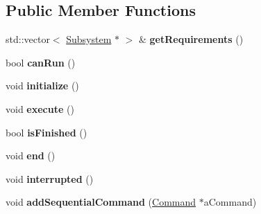 \subsection*{Public Member Functions}
\begin{DoxyCompactItemize}
\item 
\mbox{\label{classlib_iterative_robot_1_1_command_group_abf3d539920648f9dec9dfdef30699c82}} 
std\+::vector$<$ \mbox{\hyperlink{classlib_iterative_robot_1_1_subsystem}{Subsystem}} $\ast$ $>$ \& {\bfseries get\+Requirements} ()
\item 
\mbox{\label{classlib_iterative_robot_1_1_command_group_abd75c9b52e6b4ae5af1b6724e865311f}} 
bool {\bfseries can\+Run} ()
\item 
\mbox{\label{classlib_iterative_robot_1_1_command_group_a99800c5dbd05ab750aa0bb27518d0467}} 
void {\bfseries initialize} ()
\item 
\mbox{\label{classlib_iterative_robot_1_1_command_group_a5e91d370cafde43548d79945ccb4d8fe}} 
void {\bfseries execute} ()
\item 
\mbox{\label{classlib_iterative_robot_1_1_command_group_a96807a2763adf9e21ebf2cb9e3574e3c}} 
bool {\bfseries is\+Finished} ()
\item 
\mbox{\label{classlib_iterative_robot_1_1_command_group_a28ad3a1c2f6b4f9aea10efa1a824895e}} 
void {\bfseries end} ()
\item 
\mbox{\label{classlib_iterative_robot_1_1_command_group_a5174a8e63675bead12b84e39df0ae90e}} 
void {\bfseries interrupted} ()
\item 
\mbox{\label{classlib_iterative_robot_1_1_command_group_ae6cdd735460cf917243bdbfe451b651a}} 
void {\bfseries add\+Sequential\+Command} (\mbox{\hyperlink{classlib_iterative_robot_1_1_command}{Command}} $\ast$a\+Command)
\item 
\mbox{\label{classlib_iterative_robot_1_1_command_group_a339c87cb07c043b8f4fe6b29b4c46171}} 

\end{DoxyCompactItemize}
